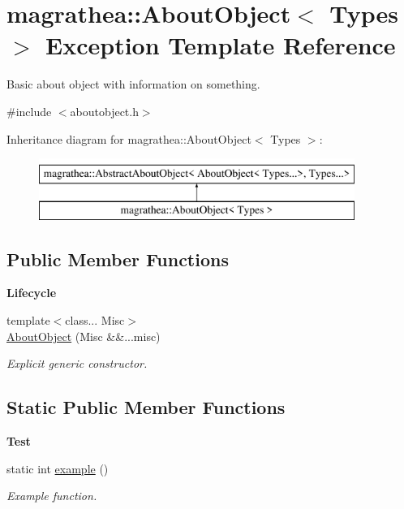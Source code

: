 \hypertarget{exceptionmagrathea_1_1AboutObject}{\section{magrathea\-:\-:About\-Object$<$ Types $>$ Exception Template Reference}
\label{exceptionmagrathea_1_1AboutObject}
}


Basic about object with information on something.  




{\ttfamily \#include $<$aboutobject.\-h$>$}

Inheritance diagram for magrathea\-:\-:About\-Object$<$ Types $>$\-:\begin{figure}[H]
\begin{center}
\leavevmode
\includegraphics[height=2.000000cm]{exceptionmagrathea_1_1AboutObject}
\end{center}
\end{figure}
\subsection*{Public Member Functions}
\begin{Indent}{\bf Lifecycle}\par
\begin{DoxyCompactItemize}
\item 
{\footnotesize template$<$class... Misc$>$ }\\\hyperlink{exceptionmagrathea_1_1AboutObject_a2e0ba5b9673ca1b445ac6c0dcdd85548}{About\-Object} (Misc \&\&...misc)
\begin{DoxyCompactList}\small\item\em Explicit generic constructor. \end{DoxyCompactList}\end{DoxyCompactItemize}
\end{Indent}
\subsection*{Static Public Member Functions}
\begin{Indent}{\bf Test}\par
\begin{DoxyCompactItemize}
\item 
static int \hyperlink{exceptionmagrathea_1_1AboutObject_aecdd3af569b2ca16de9f5b303dee4115}{example} ()
\begin{DoxyCompactList}\small\item\em Example function. \end{DoxyCompactList}\end{DoxyCompactItemize}
\end{Indent}
